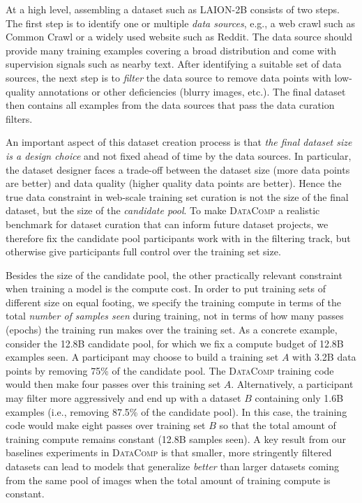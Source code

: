 \documentclass[dvipsnames,11pt]{article}
\newcommand{\datanet}{\textsc{DataComp}\xspace}
\begin{document}
At a high level, assembling a dataset such as LAION-2B consists of two steps.
The first step is to identify one or multiple \emph{data sources}, e.g., a web crawl such as Common Crawl or a widely used website such as Reddit.
The data source should provide many training examples covering a broad distribution and come with supervision signals such as nearby text.
After identifying a suitable set of data sources, the next step is to \emph{filter} the data source to remove data points with low-quality annotations or other deficiencies (blurry images, etc.).
The final dataset then contains all examples from the data sources that pass the data curation filters.

An important aspect of this dataset creation process is that \emph{the final dataset size is a design choice} and not fixed ahead of time by the data sources.
In particular, the dataset designer faces a trade-off between the dataset size (more data points are better) and data quality (higher quality data points are better).
Hence the true data constraint in web-scale training set curation is not the size of the final dataset, but the size of the \emph{candidate pool}.
To make \datanet a realistic benchmark for dataset curation that can inform future dataset projects, we therefore fix the candidate pool participants work with in the filtering track, but otherwise give participants full control over the training set size.

Besides the size of the candidate pool, the other practically relevant constraint when training a model is the compute cost.
In order to put training sets of different size on equal footing, we specify the training compute in terms of the total \emph{number of samples seen} during training, not in terms of how many passes (epochs) the training run makes over the training set.
As a concrete example, consider the 12.8B candidate pool, for which we fix a compute budget of 12.8B examples seen.
A participant may choose to build a training set $A$ with 3.2B data points by removing 75\% of the candidate pool.
The \datanet training code would then make four passes over this training set $A$.
Alternatively, a participant may filter more aggressively and end up with a dataset $B$ containing only 1.6B examples (i.e., removing 87.5\% of the candidate pool).
In this case, the training code would make eight passes over training set $B$ so that the total amount of training compute remains constant (12.8B samples seen).
A key result from our baselines experiments in \datanet is that smaller, more stringently filtered datasets can lead to models that generalize \emph{better} than larger datasets coming from the same pool of images when the total amount of training compute is constant.
\end{document}
